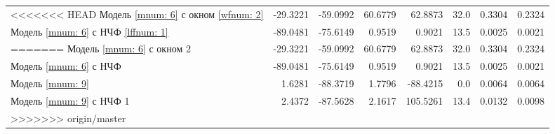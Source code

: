 \begin{table}
\begin{tabularx}{\textwidth}{X|rr|rr|r|ll}
<<<<<<< HEAD
		Модель \ref{mnum: 6} с окном \ref{wfnum: 2} 	& -29.3221 & -59.0992 & 60.6779 & 62.8873 & 32.0 & 0.3304 & 0.2324 \\
	    Модель \ref{mnum: 6} с НЧФ \ref{lffnum: 1}		& -89.0481 & -75.6149 & 0.9519 & 0.9021 & 13.5 & 0.0025 & 0.0021 \\ \hline	   	       	    
=======
		Модель \ref{mnum: 6} с окном 2 	& -29.3221 & -59.0992 & 60.6779 & 62.8873 & 32.0 & 0.3304 & 0.2324 \\
	    Модель \ref{mnum: 6} с НЧФ 		& -89.0481 & -75.6149 & 0.9519 & 0.9021 & 13.5 & 0.0025 & 0.0021 \\ 
\hline	Модель \ref{mnum: 9} & 1.6281 & -88.3719 & 1.7796  & -88.4215  & 0.0  & 0.0064 & 0.0064 \\
		Модель \ref{mnum: 9} с НЧФ 1 & 2.4372 & -87.5628 & 2.1617  & 105.5261  & 13.4  & 0.0132 & 0.0098 \\
  	       	    
>>>>>>> origin/master
\end{tabularx} 
\renewcommand{\arraystretch}{1.0}
\end{table}